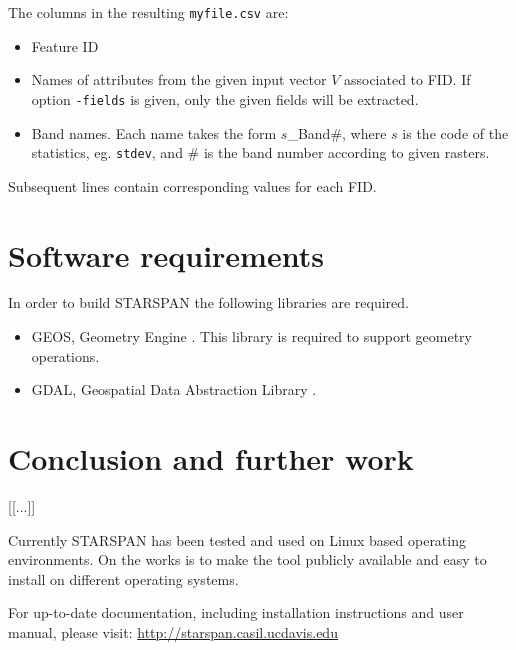 \documentclass{elsart}
\begin{document}
The columns in the resulting \verb|myfile.csv| are:

	\begin{itemize}
	
		\item Feature ID
		
		\item Names of attributes from the given input
				vector $V$ associated to FID. If option
				\verb|-fields| is given, only the given fields will
				be extracted.
		
		\item Band names. Each name takes the form
				$s$\_Band\#, where $s$ is the code of the
				statistics, eg. \verb|stdev|, and \# is the band
				number according to given rasters. \end{itemize}

Subsequent lines contain corresponding values for each FID.

\section{Software requirements}

	In order to build STARSPAN the following libraries are
	required.
	
	\begin{itemize}
	
		\item GEOS, Geometry Engine \citep{geos}.
				This library is required to support geometry operations.
				
		\item GDAL, Geospatial Data Abstraction Library \citep{gdal}.
	
	\end{itemize}



\section{Conclusion and further work}

	[[...]]
	
Currently STARSPAN has been tested and used on Linux based
operating environments. On the works is to make the tool
publicly available and easy to install on different
operating systems.


For up-to-date documentation, including installation
instructions and user manual, please visit:
\url{http://starspan.casil.ucdavis.edu}
\end{document}

